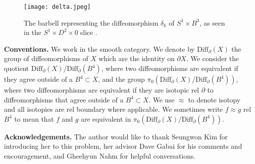 \documentclass[11pt,letterpaper,twoside]{amsart}
\theoremstyle{definition}
\begin{document}
\begin{figure}[h!]
    \centering
    \texttt{[image: delta.jpeg]}
    \caption{The barbell representing the diffeomorphism $\delta_k$ of $S^1 \times B^3$, as seen in the $S^1 \times D^2 \times 0$ slice \cite{BG}.}
    \label{delta}
\end{figure}


\noindent \textbf{Conventions.} We work in the smooth category. We denote by $\text{Diff}_\partial (X)$ the group of diffeomorphisms of $X$ which are the identity on $\partial X$. We consider the quotient $\text{Diff}_\partial (X) / \text{Diff}_\partial (B^4)$, where two diffeomorphisms are equivalent if they agree outside of a $B^4 \subset X$, and the group $\pi_0(\text{Diff}_\partial (X) / \text{Diff}_\partial (B^4))$, where two diffeomorphisms are equivalent if they are isotopic rel $\partial$ to diffeomorphisms that agree outside of a $B^4 \subset X$. We use $\approx$ to denote isotopy and all isotopies are rel boundary where applicable. We sometimes write $f\approx g$ rel $B^4$ to mean that $f$ and $g$ are equivalent in $\pi_0(\text{Diff}_\partial (X) / \text{Diff}_\partial (B^4))$.

\noindent \textbf{Acknowledgements.} The author would like to thank Seungwon Kim for introducing her to this problem, her advisor Dave Gabai for his comments and encouragement, and Gheehyun Nahm for helpful conversations.
\end{document}
